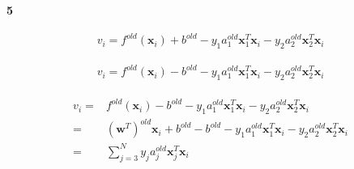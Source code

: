 \documentclass[22pt]{article}
\begin{document}
	\paragraph{5}
	\begin{equation}
		v_i = f^{old}(\mathbf{x}_i) + b^{old} - y_1a_1^{old}\mathbf{x}_1^T\mathbf{x}_i - y_2a_2^{old}\mathbf{x}_2^T\mathbf{x}_i
	\end{equation}\\[2ex]
		\begin{equation}
		v_i = f^{old}(\mathbf{x}_i) - b^{old} - y_1a_1^{old}\mathbf{x}_1^T\mathbf{x}_i - y_2a_2^{old}\mathbf{x}_2^T\mathbf{x}_i
	\end{equation}\\[2ex]
	\begin{align}
		v_i = & f^{old}(\mathbf{x}_i) - b^{old} - y_1a_1^{old}\mathbf{x}_1^T\mathbf{x}_i - y_2a_2^{old}\mathbf{x}_2^T\mathbf{x}_i\\
		= & (\mathbf{w}^T)^{old}\mathbf{x}_i + b^{old} - b^{old}- y_1a_1^{old}\mathbf{x}_1^T\mathbf{x}_i - y_2a_2^{old}\mathbf{x}_2^T\mathbf{x}_i\\
		= & \sum\limits_{j = 3}^{N} y_ja_j^{old}\mathbf{x}_j^T\mathbf{x}_i
 	\end{align}
\end{document}
